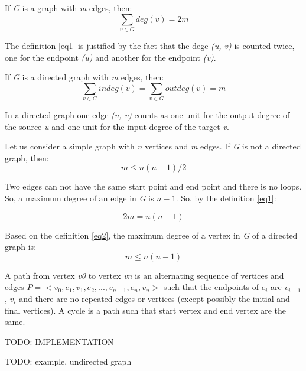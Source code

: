 \documentclass[a4paper]{article}
\begin{document}
    If \emph{G} is a graph with \emph{m} edges, then:
    \begin{equation} \label{eq1}
        \sum_{v \in G} deg(v) = 2m
    \end{equation}

    The definition \ref{eq1} is justified by the fact that the dege 
    \emph{(u, v)} is counted twice, one for the endpoint \emph{(u)} and 
    another for the endpoint \emph{(v)}.

    If \emph{G} is a directed graph with \emph{m} edges, then:
    \begin{equation} \label{eq2}
        \sum_{v \in G} indeg(v) = \sum_{v \in G} outdeg(v) = m
    \end{equation}

    In a directed graph one edge \emph{(u, v)} counts as one unit 
    for the output degree of the source \emph{u} and one unit for
    the input degree of the target \emph{v}.

    Let us consider a simple graph with \emph{n} vertices and \emph{m} 
    edges. If \emph{G} is not a directed graph, then:
    \begin{equation} \label{eq3}
        m \le n(n - 1) / 2 
    \end{equation}

    Two edges can not have the same start point and end point and there 
    is no loops. So, a maximum degree of an edge in \emph{G} is $n - 1$. 
    So, by the definition \ref{eq1}:

    \begin{equation} \label{eq4}
        2m = n(n - 1)
    \end{equation}

    Based on the definition \ref{eq2}, the maximum degree of a vertex in \emph{G}
    of a directed graph is:
    \begin{equation}
        m \le n(n-1)
    \end{equation}
    


    A path from vertex \emph{v0} to vertex \emph{vn} is an alternating sequence of 
    vertices and edges $ P =< v_0, e_1, v_1, e_2, ..., v_{n-1}, e_n, v_n > $
    such that the endpoints of $ e_i $ are $ v_{i-1} $, $ v_i $ and there are no 
    repeated edges or vertices (except possibly the initial and final vertices).
    A cycle is a path such that start vertex and end vertex are the same.


    TODO: IMPLEMENTATION

    TODO: example, undirected graph
\end{document}
